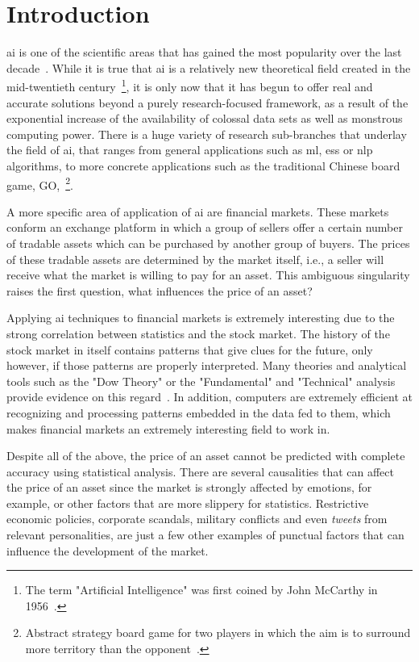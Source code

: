 \chapter{Introduction}
\label{ch:introduccion}

\gls{ai} is one of the scientific areas that has gained the most popularity over the last decade~\cite{iagoogletrend}. While it is true that \gls{ai} is a relatively new theoretical field created in the mid-twentieth century~\footnote{The term "Artificial Intelligence" was first coined by John McCarthy in 1956~\cite{definitionIaMcCarthy}.}, it is only now that it has begun to offer real and accurate solutions beyond a purely research-focused framework, as a result of the exponential increase of the availability of colossal data sets as well as monstrous computing power. There is a huge variety of research sub-branches that underlay the field of \gls{ai}, that ranges from general applications such as \gls{ml}, \glspl{es} or \gls{nlp} algorithms, to more concrete applications such as the traditional Chinese board game, GO,~\footnote{Abstract strategy board game for two players in which the aim is to surround more territory than the opponent~\cite{goDefinition}.}.

A more specific area of application of \gls{ai} are financial markets. These markets conform an exchange platform in which a group of sellers offer a certain number of tradable assets which can be purchased by another group of buyers. The prices of these tradable assets are determined by the market itself, i.e., a seller will receive what the market is willing to pay for an asset. This ambiguous singularity raises the first question, what influences the price of an asset? 

Applying \gls{ai} techniques to financial markets is extremely interesting due to the strong correlation between statistics and the stock market. The history of the stock market in itself contains patterns that give clues for the future, only however, if those patterns are properly interpreted. Many theories and analytical tools such as the "Dow Theory" or the "Fundamental" and "Technical" analysis provide evidence on this regard~\cite{stockMarketPatterns}. In addition, computers are extremely efficient at recognizing and processing patterns embedded in the data fed to them, which makes financial markets an extremely interesting field to work in.

Despite all of the above, the price of an asset cannot be predicted with complete accuracy using statistical analysis. There are several causalities that can affect the price of an asset since the market is strongly affected by emotions, for example, or other factors that are more slippery for statistics. Restrictive economic policies, corporate scandals, military conflicts and even \textit{tweets} from relevant personalities, are just a few other examples of punctual factors that can influence the development of the market.


